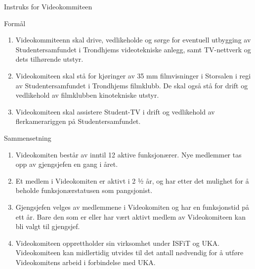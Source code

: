 
\begin{instruks}{Instruks for Videokommiteen}{ }{ }
    
    \begin{instruksledd}{Formål}
        \begin{enumerate}
            \item Videokommiteenn skal drive, vedlikeholde og sørge for eventuell
                utbygging av Studentersamfundet i
                Trondhjems videotekniske anlegg, samt TV-nettverk og dets tilhørende utstyr.
            \item Videokomiteen skal stå for kjøringer av 35 mm filmvisninger i
                Storsalen i regi av Studentersamfundet i
                Trondhjems filmklubb. De skal også stå for drift og vedlikehold av filmklubben
                kinotekniske utstyr.
            \item Videokomiteen skal assistere Student-TV i drift og vedlikehold av
                flerkamerariggen på Studentersamfundet.
        \end{enumerate}
    \end{instruksledd}

    \begin{instruksledd}{Sammensetning}
        \begin{enumerate}
            \item Videokomiten består av inntil 12 aktive funksjonærer. Nye medlemmer tas opp av
            gjengsjefen en gang i året.
            \item  Et medlem i Videokomiten er aktivt i 2 ½ år, og har etter det mulighet for å
            beholde funksjonærstatusen som
            pangsjonist.
            \item Gjengsjefen velges av medlemmene i Videokomiten og har en funksjonstid på ett
            år. Bare den som er eller
            har vært aktivt medlem av Videokomiteen kan bli valgt til gjengsjef.
            \item  Videokomiteen opprettholder sin virksomhet under ISFiT og UKA. Videokomiteen
            kan midlertidig utvides
            til det antall nødvendig for å utføre Videokomitens arbeid i forbindelse med UKA.
        \end{enumerate}
    \end{instruksledd}


\end{instruks}
